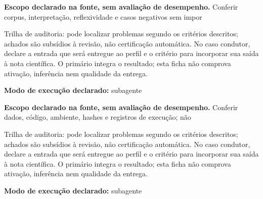 
\begin{descricao}
\textbf{Escopo declarado na fonte, sem avaliação de desempenho.}
Conferir corpus, interpretação, reflexividade e casos negativos sem impor
\end{descricao}

\begin{funcao}
Trilha de auditoria: pode localizar problemas segundo os critérios descritos; achados são subsídios à revisão, não certificação automática. No caso condutor, declare a entrada que será entregue ao perfil e o critério para incorporar sua saída à nota científica. O primário integra o resultado; esta ficha não comprova ativação, inferência nem qualidade da entrega.
\end{funcao}

\begin{arquitetura}
\textbf{Modo de execução declarado:} subagente
\end{arquitetura}


\begin{descricao}
\textbf{Escopo declarado na fonte, sem avaliação de desempenho.}
Conferir dados, código, ambiente, hashes e registros de execução; não
\end{descricao}

\begin{funcao}
Trilha de auditoria: pode localizar problemas segundo os critérios descritos; achados são subsídios à revisão, não certificação automática. No caso condutor, declare a entrada que será entregue ao perfil e o critério para incorporar sua saída à nota científica. O primário integra o resultado; esta ficha não comprova ativação, inferência nem qualidade da entrega.
\end{funcao}

\begin{arquitetura}
\textbf{Modo de execução declarado:} subagente
\end{arquitetura}

